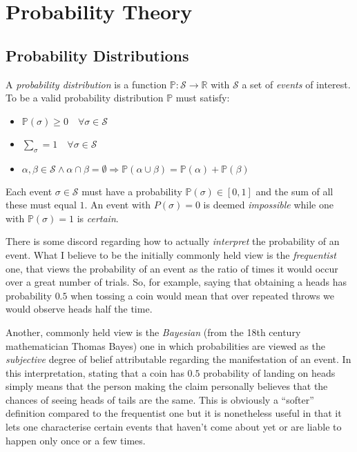 \section{Probability Theory}

\subsection{Probability Distributions} \label{subsec:probability-distributions}
\begin{definition}
	A \textit{probability distribution} is a function $\mathbb{P}: \mathcal{S} \rightarrow \mathbb{R}$ with $\mathcal{S}$ a set of \textit{events} of interest.  
To be a valid probability distribution $\mathbb{P}$ must satisfy:
\begin{itemize}
	\item $\mathbb{P}(\sigma) \geq 0 \quad \forall \sigma \in \mathcal{S}$
	\item $\sum_{\sigma} = 1 \quad \forall \sigma \in \mathcal{S}$
	\item $\alpha, \beta \in \mathcal{S} \wedge \alpha \cap \beta=\emptyset 	\Rightarrow \mathbb{P}(\alpha \cup \beta)=\mathbb{P}(\alpha)+\mathbb{P}(\beta)$
\end{itemize}
\end{definition}
Each event $\sigma \in \mathcal{S}$ must have a probability $\mathbb{P}(\sigma) \in [0,1]$ and the sum of all these must equal $1$. 
An event with $P(\sigma) = 0$ is deemed \textit{impossible} while one with $\mathbb{P}(\sigma) = 1$ is \textit{certain}.

There is some discord regarding how to actually \textit{interpret} the probability of an event.
What I believe to be the initially commonly held view is the \textit{frequentist} one, that views the probability of an event as the ratio of times it would occur over a great number of trials.  
So, for example, saying that obtaining a heads has probability $0.5$ when tossing a coin would mean that over repeated throws we would observe heads half the time.

Another, commonly held view is the \textit{Bayesian} (from the 18th century mathematician Thomas Bayes) one in which probabilities are viewed as the \textit{subjective} degree of belief attributable regarding the manifestation of an event.
In this interpretation, stating that a coin has $0.5$ probability of landing on heads simply means that the person making the claim personally believes that the chances of seeing heads of tails are the same.
This is obviously a ``softer'' definition compared to the frequentist one but it is nonetheless useful in that it lets one characterise certain events that haven't come about yet or are liable to happen only once or a few times.


